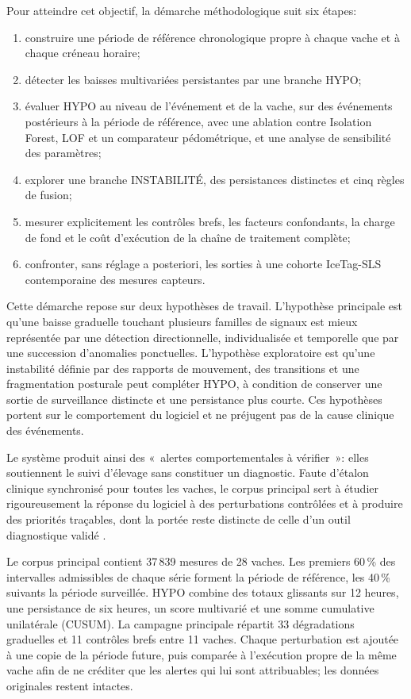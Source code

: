\begin{introduction}
Pour atteindre cet objectif, la démarche méthodologique suit six étapes:
\begin{enumerate}[itemsep=0pt, parsep=0pt, topsep=0.3\baselineskip]
  \item construire une période de référence chronologique propre à chaque vache et à chaque créneau
  horaire;
  \item détecter les baisses multivariées persistantes par une branche HYPO;
  \item évaluer HYPO au niveau de l'événement et de la vache, sur des événements postérieurs à la
  période de référence, avec une ablation contre Isolation Forest, LOF et un comparateur pédométrique,
  et une analyse de sensibilité des paramètres;
  \item explorer une branche INSTABILITÉ, des persistances distinctes et cinq règles de
  fusion;
  \item mesurer explicitement les contrôles brefs, les facteurs confondants, la charge de
  fond et le coût d'exécution de la chaîne de traitement complète;
  \item confronter, sans réglage a posteriori, les sorties à une cohorte IceTag-SLS
  contemporaine des mesures capteurs.
\end{enumerate}

Cette démarche repose sur deux hypothèses de travail. L'hypothèse principale est qu'une baisse graduelle touchant plusieurs familles de signaux
est mieux représentée par une détection directionnelle, individualisée et temporelle que par
une succession d'anomalies ponctuelles. L'hypothèse exploratoire est qu'une instabilité
définie par des rapports de mouvement, des transitions et une fragmentation posturale peut
compléter HYPO, à condition de conserver une sortie de surveillance distincte et une
persistance plus courte. Ces hypothèses portent sur le comportement du logiciel et ne
préjugent pas de la cause clinique des événements.

Le système produit ainsi des «~alertes comportementales à vérifier~»: elles soutiennent le suivi
d'élevage sans constituer un diagnostic. Faute d'étalon clinique synchronisé pour toutes les
vaches, le corpus principal sert à étudier rigoureusement la réponse du logiciel à des
perturbations contrôlées et à produire des priorités traçables, dont la portée reste distincte de
celle d'un outil diagnostique validé \citep{alsaaod2019automatic}.

Le corpus principal contient 37\,839 mesures de 28 vaches. Les premiers 60\,\% des intervalles
admissibles de chaque série forment la période de référence, les 40\,\% suivants la période
surveillée. HYPO combine des totaux glissants sur 12 heures, une persistance de six heures, un
score multivarié et une somme cumulative unilatérale (CUSUM). La campagne principale répartit
33 dégradations graduelles et 11 contrôles brefs entre 11 vaches. Chaque perturbation est ajoutée
à une copie de la période future, puis comparée à l'exécution propre de la même vache afin de ne
créditer que les alertes qui lui sont attribuables; les données originales restent intactes.


\end{introduction}
